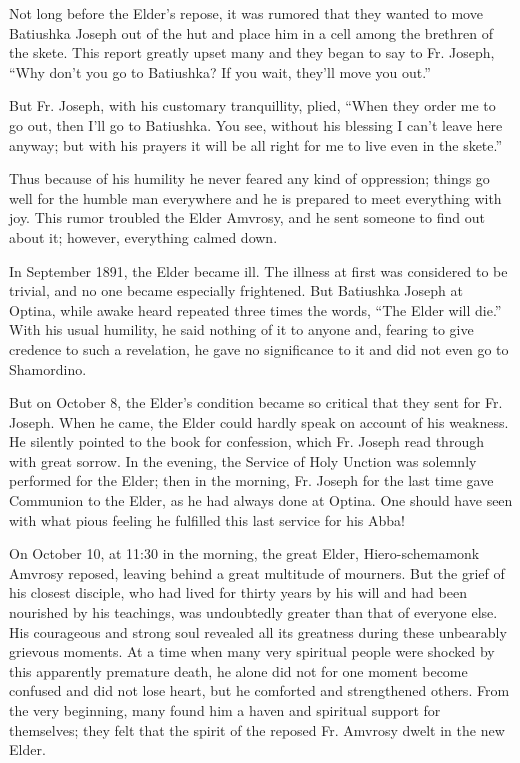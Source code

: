 Not long before the Elder's repose, it was rumored that they wanted to move Batiushka Joseph out of the hut and place him in a cell among the brethren of the skete. This report greatly upset many and they began to say to Fr. Joseph, “Why don't you go to Batiushka? If you wait, they'll move you out.”

But Fr. Joseph, with his customary tranquillity, plied, “When they order me to go out, then I'll go to Batiushka. You see, without his blessing I can't leave here anyway; but with his prayers it will be all right for me to live even in the skete.”

Thus because of his humility he never feared any kind of oppression; things go well for the humble man everywhere and he is prepared to meet everything with joy. This rumor troubled the Elder Amvrosy, and he sent someone to find out about it; however, everything calmed down.

In September 1891, the Elder became ill. The illness at first was considered to be trivial, and no one became especially frightened. But Batiushka Joseph at Optina, while awake heard repeated three times the words, “The Elder will die.” With his usual humility, he said nothing of it to anyone and, fearing to give credence to such a revelation, he gave no significance to it and did not even go to Shamordino.

But on October 8, the Elder's condition became so critical that they sent for Fr. Joseph. When he came, the Elder could hardly speak on account of his weakness. He silently pointed to the book for confession, which Fr. Joseph read through with great sorrow. In the evening, the Service of Holy Unction was solemnly performed for the Elder; then in the morning, Fr. Joseph for the last time gave Communion to the Elder, as he had always done at Optina. One should have seen with what pious feeling he fulfilled this last service for his Abba!

On October 10, at 11:30 in the morning, the great Elder, Hiero-schemamonk Amvrosy reposed, leaving behind a great multitude of mourners. But the grief of his closest disciple, who had lived for thirty years by his will and had been nourished by his teachings, was undoubtedly greater than that of everyone else. His courageous and strong soul revealed all its greatness during these unbearably grievous moments. At a time when many very spiritual people were shocked by this apparently premature death, he alone did not for one moment become confused and did not lose heart, but he comforted and strengthened others. From the very beginning, many found him a haven and spiritual support for themselves; they felt that the spirit of the reposed Fr. Amvrosy dwelt in the new Elder.

